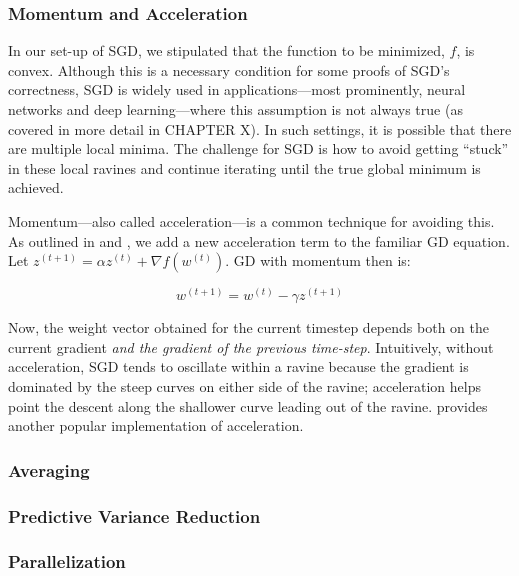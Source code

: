 \documentclass{article}
\begin{document}
\subsubsection{Momentum and Acceleration}

In our set-up of SGD, we stipulated that the function to be minimized, $f$, is
convex. Although this is a necessary condition for some proofs of SGD's
correctness, SGD is widely used in applications---most prominently, neural
networks and deep
learning---where this assumption is not
always true (as covered in more detail in CHAPTER X). In such settings, it is
possible that there are multiple local minima. The challenge for SGD is
how to avoid getting ``stuck'' in these local ravines and continue iterating
until the true global minimum is achieved.

Momentum---also called acceleration---is a common technique for avoiding this. As outlined in
\cite{rumelhart1986general} and 
\cite{qian1999momentum}, we add a new acceleration term to the familiar GD
equation. Let $z^{(t+1)} = \alpha z^{(t)} + \nabla f(w^{(t)})$. GD with
momentum then is:

\begin{equation}
	w^{(t+1)} = w^{(t)} - \gamma z^{(t+1)}
\end{equation}

Now, the weight vector obtained for the current timestep depends both on the
current gradient \textit{and the gradient of the previous time-step}.
Intuitively, without acceleration, SGD tends to oscillate within a ravine
because the gradient is dominated by the steep curves on either side of the
ravine; acceleration helps point the descent along the shallower curve leading
out of the ravine. \cite{nesterov} provides another popular implementation of
acceleration.
\cite{polyak1992acceleration}

\subsubsection{Averaging}

\subsubsection{Predictive Variance Reduction}

\subsubsection{Parallelization}
\end{document}
